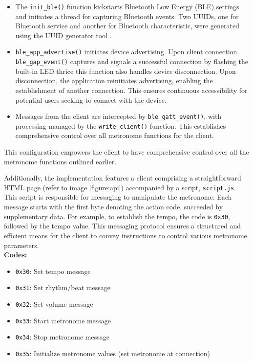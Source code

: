 \documentclass[a4paper, 11pt, a4paper]{article}
\begin{document}
\begin{itemize}
    \item The \verb|init_ble()| function kickstarts Bluetooth Low Energy (BLE) settings and initiates a thread for capturing Bluetooth events. Two UUIDs, one for Bluetooth service and another for Bluetooth characteristic, were generated using the UUID generator tool \cite{UUID.gen}. 
    \item \verb|ble_app_advertise()| initiates device advertising. Upon client connection, \verb|ble_gap_event()| captures and signals a successful connection by flashing the built-in LED thrice this function also handles device disconnection. Upon disconnection, the application reinitiates advertising, enabling the establishment of another connection. This ensures continuous accessibility for potential users seeking to connect with the device.
    \item Messages from the client are intercepted by \verb|ble_gatt_event()|, with processing managed by the \verb|write_client()| function. This establishes comprehensive control over all metronome functions for the client.
\end{itemize}

\noindent This configuration empowers the client to have comprehensive control over all the metronome functions outlined earlier.

Additionally, the implementation features a client comprising a straightforward HTML page (refer to image \ref{figure:api}) accompanied 
by a script, \texttt{script.js}. This script is responsible for messaging to manipulate the metronome. Each message starts with the 
first byte denoting the action code, succeeded by supplementary data. For example, to establish the tempo, the code is \texttt{0x30}, 
followed by the tempo value. This messaging protocol ensures a structured and efficient means for the client to convey instructions 
to control various metronome parameters.\\

\noindent\textbf{Codes:}

\begin{itemize}
    \item \texttt{0x30}: Set tempo message
    \item \texttt{0x31}: Set rhythm/beat message
    \item \texttt{0x32}: Set volume message
    \item \texttt{0x33}: Start metronome message
    \item \texttt{0x34}: Stop metronome message
    \item \texttt{0x35}: Initialize metronome values (set metronome at connection)
\end{itemize}
\end{document}
